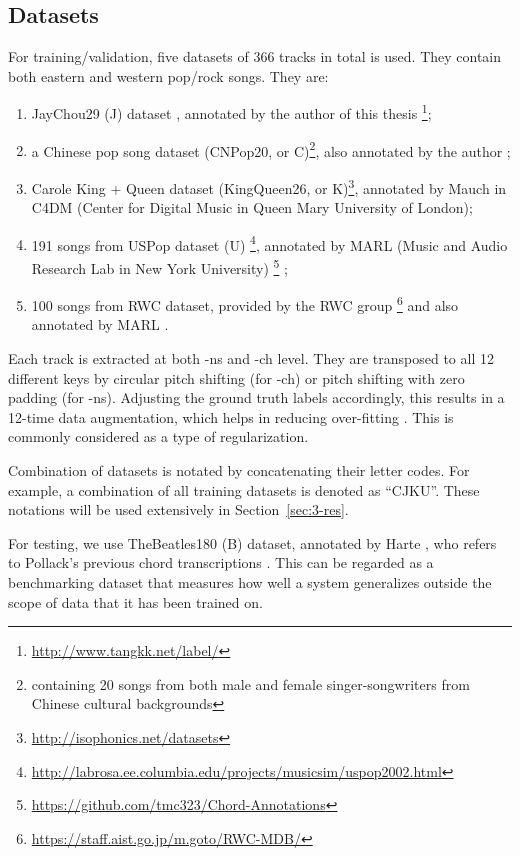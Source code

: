 \subsection{Datasets}
For training/validation, five datasets of 366 tracks in total is used. They contain both eastern and western pop/rock songs. They are:
\begin{enumerate}
\item JayChou29 (J) dataset \cite{deng2016chord}, annotated by the author of this thesis \footnote{\url{http://www.tangkk.net/label/}};
\item a Chinese pop song dataset (CNPop20, or C)\footnote{containing 20 songs from both male and female singer-songwriters from Chinese cultural backgrounds}, also annotated by the author \cite{deng2016hybrid};
\item Carole King + Queen dataset (KingQueen26, or K)\footnote{\url{http://isophonics.net/datasets}}, annotated by Mauch \cite{mauch2009omras2} in C4DM (Center for Digital Music in Queen Mary University of London);
\item 191 songs from USPop dataset (U) \footnote{\url{http://labrosa.ee.columbia.edu/projects/musicsim/uspop2002.html}}, annotated by MARL (Music and Audio Research Lab in New York University) \footnote{\url{https://github.com/tmc323/Chord-Annotations}} \cite{cho2014improved};
\item 100 songs from RWC dataset, provided by the RWC group \footnote{\url{https://staff.aist.go.jp/m.goto/RWC-MDB/}} and also annotated by MARL \cite{cho2014improved}.
\end{enumerate}


Each track is extracted at both -ns and -ch level. They are transposed to all 12 different keys by circular pitch shifting (for -ch) or pitch shifting with zero padding (for -ns). Adjusting the ground truth labels accordingly, this results in a 12-time data augmentation, which helps in reducing over-fitting \cite{cho2014improved,humphrey2015exploration}. This is commonly considered as a type of regularization.

Combination of datasets is notated by concatenating their letter codes. For example, a combination of all training datasets is denoted as ``CJKU''. These notations will be used extensively in Section~\ref{sec:3-res}.

For testing, we use TheBeatles180 (B) dataset, annotated by Harte \cite{harte2010towards}, who refers to Pollack's previous chord transcriptions \cite{pollack2000notes}. This can be regarded as a benchmarking dataset that measures how well a system generalizes outside the scope of data that it has been trained on.

